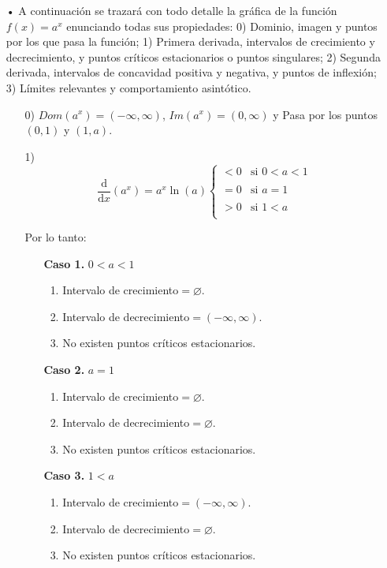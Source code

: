 \documentclass[pts12]{article}
\numberwithin{equation}{section}
\newcommand{\Col}{\color{ProcessBlue}}
\newcommand{\derivate}[2]{\frac{\mathrm{d}}{\mathrm{d}#1} \left(  {#2}  \right)  }
\begin{document}
\begin{itemize}
\item[\Col •] A continuación se trazará con todo detalle la gráfica de la función $f(x)=a^x$ enunciando todas sus propiedades: 0) Dominio, imagen y puntos por los que pasa la función; 1) Primera derivada, intervalos de crecimiento y decrecimiento, y puntos críticos estacionarios o puntos singulares; 2) Segunda derivada, intervalos de concavidad positiva y negativa, y puntos de inflexión; 3) Límites relevantes y comportamiento asintótico. 

\begin{enumerate}
\item[0)] $Dom(a^x)=(-\infty,\infty)$, $Im(a^x)=(0,\infty)$ y Pasa por los puntos $(0,1)$ y $(1,a)$.
\item[1)] $$ \derivate{x}{a^x}=a^x\ln(a)
\left\{
 \begin{array}{lll}
  <0  & \mbox{si } 0<a<1 \\
  \\ =0 & \mbox{si } a=1 \\
  \\ >0 & \mbox{si } 1<a \\
 \end{array}
\right.$$

Por lo tanto:

\begin{enumerate}

\item[\textbf{Caso 1.}]  $0<a<1$
\begin{enumerate}
\item Intervalo de crecimiento$=\varnothing$.
\item Intervalo de decrecimiento$=(-\infty,\infty)$.
\item No existen puntos críticos estacionarios.
\end{enumerate} 

\item[\textbf{Caso 2.}]  $a=1$
\begin{enumerate}
\item Intervalo de crecimiento$=\varnothing$.
\item Intervalo de decrecimiento$=\varnothing$.
\item No existen puntos críticos estacionarios.
\end{enumerate} 

\item[\textbf{Caso 3.}]  $1<a$
\begin{enumerate}
\item Intervalo de crecimiento$=(-\infty,\infty)$.
\item Intervalo de decrecimiento$=\varnothing$.
\item No existen puntos críticos estacionarios.
\end{enumerate} 


\end{enumerate}
\end{enumerate}
\end{itemize}
\end{document}
